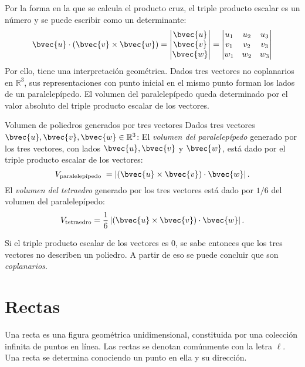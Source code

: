 \documentclass{fmbnotes}
\begin{document}
Por la forma en la que se calcula el producto cruz, el triple producto escalar es un número y se puede escribir como un determinante:
\[\bvec{u} \cdot(\bvec{v} \times \bvec{w})=\begin{vmatrix}
\bvec{u} \\ \bvec{v} \\ \bvec{w}
\end{vmatrix}=\begin{vmatrix}
u_1 & u_2 & u_3 \\ v_1 & v_2 & v_3 \\ w_1 & w_2 & w_3
\end{vmatrix}\]
Por ello, tiene una interpretación geométrica. Dados tres vectores no coplanarios en \( \mathbb{R}^{3} \), sus representaciones con punto inicial en el mismo punto forman los lados de un paralelepípedo. El volumen del paralelepípedo queda determinado por el valor absoluto del triple producto escalar de los vectores.

\begin{definicion}{Volumen de poliedros generados por tres vectores}{}
Dados tres vectores \( \bvec{u}, \bvec{v}, \bvec{w} \in \mathbb{R}^{3} \):
El \emph{volumen del paralelepípedo} generado por los tres vectores, con lados \( \bvec{u}, \bvec{v} \) y \( \bvec{w} \), está dado por el triple producto escalar de los vectores:
\begin{equation*}
	V_{\text{paralelepípedo }}=\left|(\bvec{u} \times \bvec{v}) \cdot \bvec{w}\right|.
\end{equation*}
El \emph{volumen del tetraedro} generado por los tres vectores está dado por \(1/6\) del volumen del paralelepípedo:
\begin{equation*}
	V_{\text{tetraedro}}=\frac{1}{6}\left|(\bvec{u} \times \bvec{v}) \cdot \bvec{w}\right|.
\end{equation*}
\end{definicion}
Si el triple producto escalar de los vectores es \(0\), se sabe entonces que los tres vectores no describen un poliedro. A partir de eso se puede concluir que son \emph{coplanarios}.


\section{Rectas}
Una recta es una figura geométrica unidimensional, constituida por una colección infinita de puntos en línea. Las rectas se denotan comúnmente con la letra \(\ell\). Una recta se determina conociendo un punto en ella y su dirección.
\end{document}
